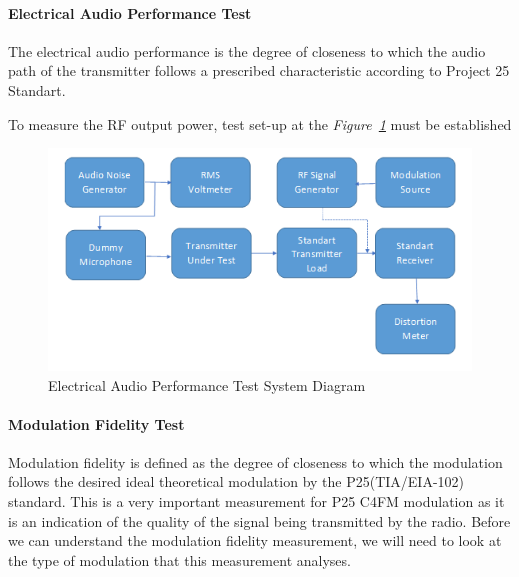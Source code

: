 




\paragraph{Electrical Audio Performance Test}
\- \indent
	The electrical audio performance is the degree of closeness to which the audio path of the transmitter follows a prescribed characteristic according to Project 25 Standart\cite{P25}.

	To measure the RF output power, test set-up at the \textit{Figure~\ref{fig:elecaudio}} must be established
	
\begin{figure}[H]
	\center
	\setlength{\unitlength}{\textwidth} 
	\includegraphics[width=1.0\unitlength]{elecaudio}
	\caption{\label{fig:elecaudio}Electrical Audio Performance Test System Diagram }
\end{figure}

\paragraph{Modulation Fidelity Test}
\- \indent
	Modulation fidelity is defined as the degree of closeness to which the modulation follows the desired ideal theoretical modulation by the P25(TIA/EIA-102) standard\cite{fidelity}. This is a very important measurement for P25 C4FM modulation as it is an indication of the quality of the signal being transmitted by the radio. Before we can understand the
modulation fidelity measurement, we will need to look at the type
of modulation that this measurement analyses.


